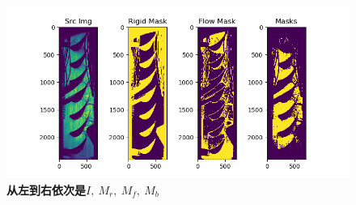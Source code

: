 \begin{figure}[h]
	\begin{center}
		\includegraphics[width=0.95\linewidth]{src/masks}
	\end{center}
	\caption{ \textbf{从左到右依次是$I,~M_r,~M_f,~M_b$}}
	\label{fig:masks}	
\end{figure}